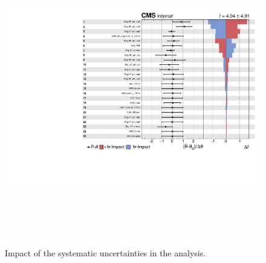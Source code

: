 \begin{figure}[!ht]
\caption{ Impact of the systematic uncertainties in the analysis.}
\begin{center}
  \includegraphics[height=13cm, width=15cm]{figuresARC/systematics/impacts.pdf}
\end{center}
\label{fig:impact}
\end{figure}
